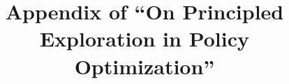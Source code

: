 \documentclass[twoside]{article}
\begin{document}
%

%

\setcounter{equation}{11}
\setcounter{thm}{2}
\setcounter{lem}{2}
\setcounter{prop}{3}
\setcounter{remk}{1}

\setcounter{algorithm}{1}


\onecolumn

\title{Appendix of ``On Principled Exploration in Policy Optimization''}
\date{}
\maketitle

\appendix 


%


\end{document}
